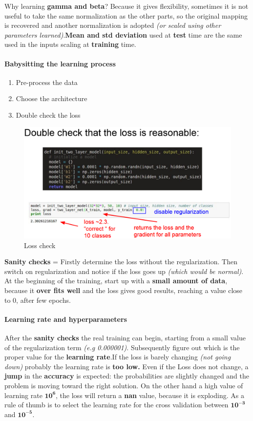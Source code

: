 \documentclass[11pt]{article}
\begin{document}
Why learning \textbf{gamma and beta}? Because it  gives flexibility, sometimes it is not useful to take the same normalization as the other parts, so the original mapping is recovered and another normalization is adopted  \textit{(or scaled using other parameters learned)}.\textbf{Mean and std deviation} used at \textbf{test }time are the same used in the inputs scaling at \textbf{training} time.
\paragraph{Babysitting the learning process}
\begin{enumerate}
    \item Pre-process the data
    \item Choose the architecture
    \item Double check the loss
\end{enumerate}{}
\begin{figure}[h]
\centering
\captionsetup{justification=centering}
\includegraphics[width=0.9\linewidth]{L510.pdf}
\caption{ Loss check}
\label{fig:L510}
\end{figure}

\textbf{Sanity checks} = Firstly determine the loss without the regularization. Then switch on regularization and notice if the loss goes up \textit{(which would be normal)}.\\


At the beginning of the training, start up with a \textbf{small amount of data}, because it \textbf{over fits well } and the loss gives good results, reaching a value close to 0, after few epochs.

\paragraph{Learning rate and hyperparameters}
After the \textbf{ sanity checks } the real training can begin, starting from a small value of the regularization term \textit{(e.g 0.000001)}. Subsequently figure out which is the proper value for the \textbf{learning rate}.If the loss is barely changing \textit{(not going down)} probably the learning rate is\textbf{ too low.} Even if the Loss does not change, a \textbf{jump } in the \textbf{accuracy} is expected: the probabilities are slightly changed and the problem is moving toward the right solution. On the other hand a high value of learning rate $\mathbf{10^{6}}$, the loss will return a \textbf{nan} value, because it is exploding.
As a rule of thumb is to select the learning rate for the cross validation between $\mathbf{10^{-3}}$ and $\mathbf{10^{-5}}$.
\end{document}
